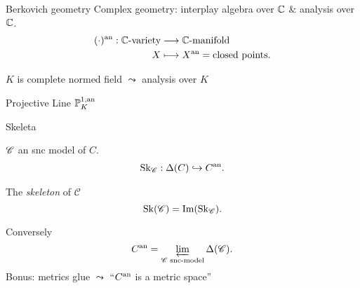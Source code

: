 \begin{frame}
	\tableofcontents[ 
currentsubsection, 
hideothersubsections, 
sectionstyle=show/hide, 
subsectionstyle=show/shaded, 
] 
\end{frame}


\begin{frame}{Berkovich geometry}
	Complex geometry: interplay algebra over $\mathbb C$ \& analysis over $\mathbb C$. 
	\begin{align*}
		(\cdot ){}^{\text{an}} : \mathbb C\text{-variety} &\longrightarrow \mathbb C\text{-manifold} \\
		X &\longmapsto X{}^{\text{an}} = \text{closed points} 
	.\end{align*}
	\pause

	$K$ is complete normed field $\leadsto$ analysis over $K$ 
\end{frame}

\begin{frame}{Projective Line $\mathbb P^{1, \text{an}}_{K}$}
\end{frame}

\begin{frame}{Skeleta}
	\begin{minipage}{.49\textwidth}
	 $\mathscr C$ an snc model of  $C$. 
	 \begin{align*}
		 \operatorname{Sk}_{\mathscr C}: \Delta(C) \hookrightarrow C{}^{\text{an}}
	 .\end{align*}
	\end{minipage}\;\;
	\begin{minipage}{.48\textwidth}
	 \begin{definition}
		 The \emph{skeleton} of $\mathscr C$
	 	\[
			\operatorname{Sk}(\mathscr C) = \operatorname{Im} (\operatorname{Sk}_{\mathscr C})
	 	.\] 
	 \end{definition}
	\end{minipage}

	\bigskip
	\pause

	 Conversely \[
		 C{}^{\text{an}} = \varprojlim_{\mathscr C \text{ snc-model}} \Delta(\mathscr C)
	 .\] 
	 Bonus: metrics glue $\leadsto$ ``$C{}^{\text{an}}$ is a metric space''
\end{frame}


